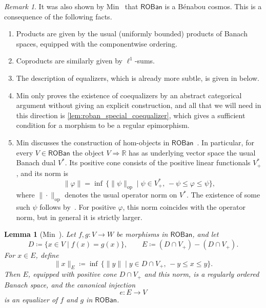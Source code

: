 \documentclass[11pt,onecolumn]{article}
\newcommand{\R}{\mathbb{R}}
\newcommand{\ROBan}{\mathsf{ROBan}}
\theoremstyle{plain}
\newtheorem{lem}[lem]{Lemma}
\theoremstyle{remark}
\newtheorem{remark}[remark]{Remark}
\theoremstyle{definition}
\begin{document}
\begin{remark}
	\label{roban_internal_hom}
	It was also shown by Min~\cite[Sections~4~and~5]{MinExponentialLaw} that $\ROBan$ is a B\'enabou cosmos.
	This is a consequence of the following facts.
	\begin{enumerate}
		\item Products are given by the usual (uniformly bounded) products of Banach spaces, equipped with the componentwise ordering.
		\item Coproducts are similarly given by $\ell^1$-sums.
		\item The description of equalizers, which is already more subtle, is given in  below.
		\item Min only proves the existence of coequalizers by an abstract categorical argument without giving an explicit construction,
			and all that we will need in this direction is \cref{lem:roban_special_coequalizer},
			which gives a sufficient condition for a morphism to be a regular epimorphism.
		\item\label{roban_dual}
			Min discusses the construction of hom-objects in $\ROBan$~\cite[Section~2]{MinExponentialLaw}.
			In particular, for every $V \in \ROBan$ the object $V \Rightarrow \R$ has as underlying vector space the usual Banach dual $V^*$.
			Its positive cone consists of the positive linear functionals $V^*_+$, and its norm is
			\begin{equation}
				\label{eq:roban_dual_norm}
				\|\varphi\| = \inf \, \{ \|\psi\|_{\mathrm{op}} \mid \psi \in V^*_+,\, -\psi \le \varphi \le \psi \},
			\end{equation}
			where $\|\cdot\|_{\mathrm{op}}$ denotes the usual operator norm on $V^*$.
			The existence of some such $\psi$ follows by~\cite[Theorem~3.6.7]{JamesonOrderedLinearSpaces}.
			For positive $\varphi$, this norm coincides with the operator norm, but in general it is strictly larger.
	\end{enumerate}
\end{remark}

\begin{lem}[{Min~\cite[Proposition~5.2]{MinExponentialLaw}}]
	\label{lem:roban_equalizer}
	Let $f,g \colon V \to W$ be morphisms in $\ROBan$, and let
	\[
		D \coloneqq \{x \in V \mid f(x) = g(x)\},
		\qquad
		E \coloneqq (D \cap V_+) - (D \cap V_+).
	\]
	For $x \in E$, define
	\[
		\|x\|_E \coloneqq \inf \, \{ \|y\| \mid y \in D \cap V_+,\, -y \le x \le y \}.
	\]
	Then $E$, equipped with positive cone $D \cap V_+$ and this norm, is a regularly ordered Banach space, and the canonical injection
	\[
		e \colon E \longrightarrow V
	\]
	is an equalizer of $f$ and $g$ in $\ROBan$.
\end{lem}
\end{document}
